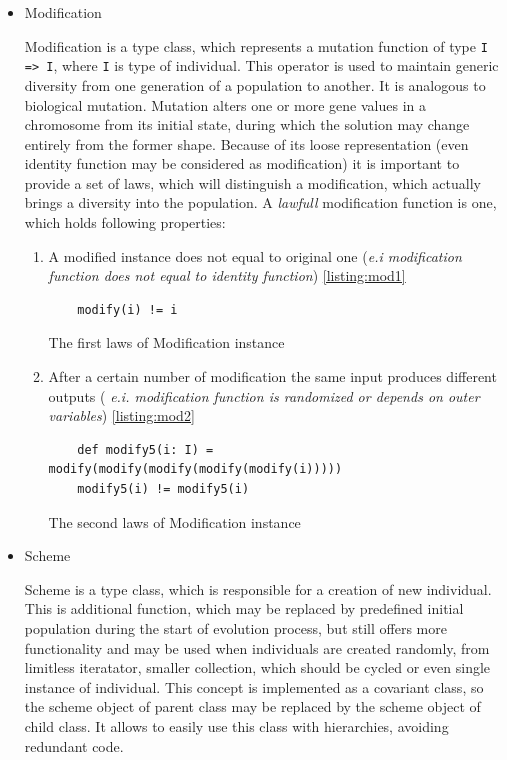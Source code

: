 \begin{itemize}
\begin{itemize}
\item
Modification

Modification is a type class, which represents a mutation function of type \texttt{I => I}, where \texttt{I} is type of individual. This operator is used to maintain generic diversity from one generation of a population to another. It is analogous to biological mutation. Mutation alters one or more gene values in a chromosome from its initial state, during which the solution may change entirely from the former shape. Because of its loose representation (even identity function may be considered as modification) it is important to provide a set of laws, which will distinguish a modification, which actually brings a diversity into the population. A \textit{lawfull} modification function is one, which holds following properties:

\begin{enumerate}
\item
A modified instance does not equal to original one (\textit{e.i modification function does not equal to identity function}) \ref{listing:mod1}

\begin{listing}
\begin{verbatim}
	modify(i) != i
\end{verbatim}
\caption{The first laws of Modification instance} \label{listing:mod1}
\end{listing}

\item
After a certain number of modification the same input produces different outputs (\textit{ e.i. modification function is randomized or depends on outer variables}) \ref{listing:mod2}

\begin{listing}
\begin{verbatim}
	def modify5(i: I) = modify(modify(modify(modify(modify(i)))))
	modify5(i) != modify5(i)
\end{verbatim}
\caption{The second laws of Modification instance} \label{listing:mod2}
\end{listing}


\end{enumerate}
\medbreak

\item
Scheme

Scheme is a type class, which is responsible for a creation of new individual. This is additional function, which may be replaced by predefined initial population during the start of evolution process, but still offers more functionality and may be used when individuals are created randomly, from limitless iteratator, smaller collection, which should be cycled or even single instance of individual. This concept is implemented as a covariant class, so the scheme object of parent class may be replaced by the scheme object of child class. It allows to easily use this class with hierarchies, avoiding redundant code. 
\end{itemize} 


\end{itemize}
